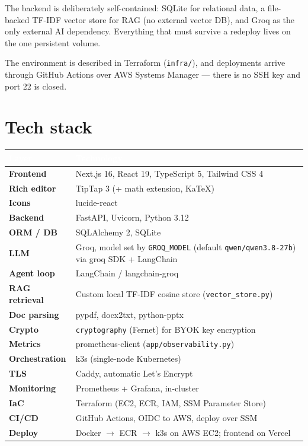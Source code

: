 \documentclass[11pt,a4paper]{article}
\newcommand{\code}[1]{\colorbox{fbCream}{\texttt{\small #1}}}
\newcommand{\hdr}[1]{\textcolor{white}{\bfseries #1}}
\begin{document}
The backend is deliberately self-contained: SQLite for relational data, a
file-backed TF-IDF vector store for RAG (no external vector DB), and Groq as the
only external AI dependency. Everything that must survive a redeploy lives on the
one persistent volume.

The environment is described in Terraform (\code{infra/}), and deployments
arrive through GitHub Actions over AWS Systems Manager --- there is no SSH key
and port 22 is closed.

\section{Tech stack}

\begin{tabularx}{\textwidth}{>{\bfseries}l L}
\toprule
{}\hdr{Layer} & \hdr{Technology} \\
\midrule
Frontend        & Next.js 16, React 19, TypeScript 5, Tailwind CSS 4 \\
Rich editor     & TipTap 3 (+ math extension, KaTeX) \\
Icons           & lucide-react \\
Backend         & FastAPI, Uvicorn, Python 3.12 \\
ORM / DB        & SQLAlchemy 2, SQLite \\
LLM             & Groq, model set by \code{GROQ\_MODEL} (default
                  \code{qwen/qwen3.8-27b}) via groq SDK + LangChain \\
Agent loop      & LangChain / langchain-groq \\
RAG retrieval   & Custom local TF-IDF cosine store (\code{vector\_store.py}) \\
Doc parsing     & pypdf, docx2txt, python-pptx \\
Crypto          & \code{cryptography} (Fernet) for BYOK key encryption \\
Metrics         & prometheus-client (\code{app/observability.py}) \\
Orchestration   & k3s (single-node Kubernetes) \\
TLS             & Caddy, automatic Let's Encrypt \\
Monitoring      & Prometheus + Grafana, in-cluster \\
IaC             & Terraform (EC2, ECR, IAM, SSM Parameter Store) \\
CI/CD           & GitHub Actions, OIDC to AWS, deploy over SSM \\
Deploy          & Docker $\rightarrow$ ECR $\rightarrow$ k3s on AWS EC2;
                  frontend on Vercel \\
\bottomrule
\end{tabularx}
\end{document}
